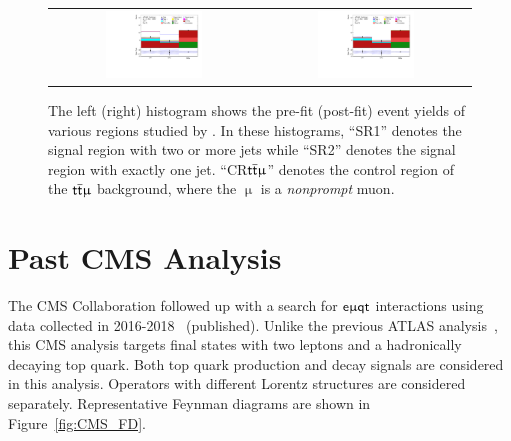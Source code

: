 \begin{figure}[tbh!]
 \begin{center}
 \begin{tabular}{cc}
 \includegraphics[width=0.48\textwidth]{figures/Part3/History/ATLAS_results3}&
 \includegraphics[width=0.48\textwidth]{figures/Part3/History/ATLAS_results4}\\
 \end{tabular}
 \caption{The left (right) histogram shows the pre-fit (post-fit) event yields of various regions studied by \cite{ATLAS-CONF-2023-001}. In these histograms, ``SR1'' denotes the signal region with two or more jets while ``SR2'' denotes the signal region with exactly one jet. ``CR$\textsf{t}\overline{\textsf{t}}\upmu$'' denotes the control region of the $\textsf{t}\overline{\textsf{t}}\upmu$ background, where the $\upmu$ is a \emph{nonprompt} muon.}
 \label{fig:ATLAS_results2}
 \end{center}
\end{figure}
\section{Past CMS Analysis}
\label{sec:CLFV_CMS}

The \ac{CMS} Collaboration followed up with a search for $\textsf{e}\upmu\textsf{{q}t}$ interactions using data collected in 2016-2018~\cite{CMS:2022ztx} (published). Unlike the previous \ac{ATLAS} analysis~\cite{ATLAS-CONF-2018-044}, this \ac{CMS} analysis targets final states with two leptons and a hadronically decaying top quark. Both top quark production and decay signals are considered in this analysis. Operators with different Lorentz structures are considered separately. Representative Feynman diagrams are shown in Figure~\ref{fig:CMS_FD}. 


